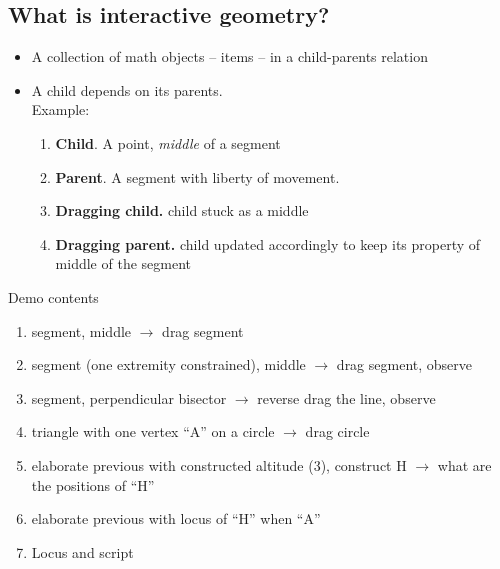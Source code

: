 \documentclass{beamer}
\newcommand{\cmark}{\text{\ding{51}}}
\newcommand{\xmark}{\text{\ding{55}}}
\begin{document}
\subsection{What is interactive geometry?}
\begin{frame}
  \begin{itemize}
  \item A collection of math objects -- items -- in a child-parents
    relation
  \item A child depends on its parents. \\
    Example:
    \begin{enumerate}
    \item \textbf{Child}. A point, \emph{middle} of a segment
    \item \textbf{Parent}. A segment with liberty of movement.
    \item \textbf{Dragging child.} \textcolor{red}{\xmark} child stuck as a middle
    \item \textbf{Dragging parent.} \textcolor{green}{\cmark} child
      updated accordingly to keep its property of middle of the
      segment
    \end{enumerate}
  \end{itemize}
\end{frame}
%
\begin{frame}
  \begin{center}
  \end{center}
\end{frame}
%
\begin{frame}{Demo contents}
  \begin{enumerate}
  \item segment, middle  $\rightarrow$ drag segment
  \item segment (one extremity constrained), middle $\rightarrow$ drag segment, observe
  \item segment, perpendicular bisector $\rightarrow$ reverse drag the line, observe
  \item triangle with one vertex ``A'' on a circle $\rightarrow$ drag circle
  \item elaborate previous with constructed altitude (3), construct H
    $\rightarrow$ what are the positions of ``H''
  \item elaborate previous with locus of ``H'' when ``A''
  \item Locus and script
  \end{enumerate}
\end{frame}
\end{document}
